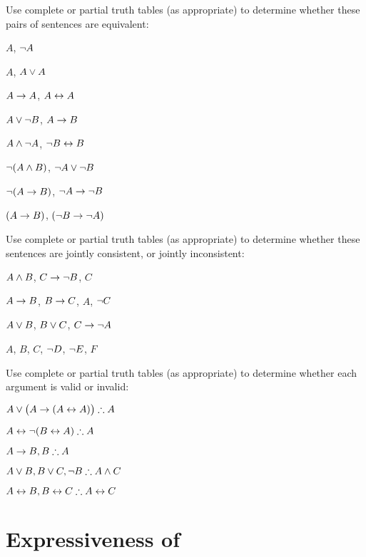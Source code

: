 \problempart
\label{pr.TT.equiv}
Use complete or partial truth tables (as appropriate) to determine whether these pairs of sentences are equivalent:
\begin{earg}
\item $A$, $\neg A$ %
\item $A$, $A \vee A$ %
\item $A\rightarrow A$, $A \leftrightarrow A$ %
\item $A \vee \neg B$, $A\rightarrow B$ %
\item $A \wedge \neg A$, $\neg B \leftrightarrow B$ %
\item $\neg(A \wedge B)$, $\neg A \vee \neg B$ %
\item $\neg(A \rightarrow B)$, $\neg A \rightarrow \neg B$ %
\item $(A \rightarrow B)$, $(\neg B \rightarrow \neg A)$ %
\end{earg}


\problempart
\label{pr.TT.consistent.partial}
Use complete or partial truth tables (as appropriate) to determine whether these sentences are jointly consistent, or jointly inconsistent:
\begin{earg}
\item $A \wedge B$, $C\rightarrow \neg B$, $C$ %
\item $A\rightarrow B$, $B\rightarrow C$, $A$, $\neg C$ %
\item $A \vee B$, $B\vee C$, $C\rightarrow \neg A$ %
\item $A$, $B$, $C$, $\neg D$, $\neg E$, $F$ %
\end{earg}


\problempart
\label{pr.TT.valid.partial}
Use complete or partial truth tables (as appropriate) to determine whether each argument is valid or invalid:
\begin{earg}
\item $A\vee\bigl(A\rightarrow(A\leftrightarrow A) \bigr) \mathrel{\therefore} A$ %
\item $A\leftrightarrow\neg(B\leftrightarrow A) \mathrel{\therefore} A$ %
\item $A\rightarrow B, B \mathrel{\therefore} A$ %
\item $A\vee B, B\vee C, \neg B \mathrel{\therefore} A \wedge C$ %
\item $A\leftrightarrow B, B\leftrightarrow C \mathrel{\therefore} A\leftrightarrow C$ %
\end{earg}

\chapter{Expressiveness of \textnormal{\TFL}}\label{s:expressiveness} 

